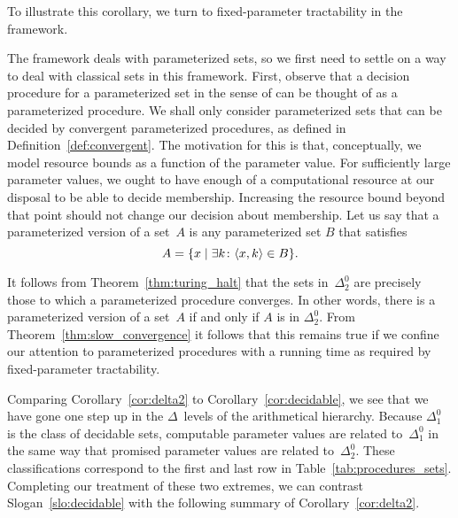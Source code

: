 To illustrate this corollary, we turn to fixed-parameter tractability in the \citeauthor{downey1999parameterized} framework.
\begin{example}
\label{ex:delta2}%
  The \citeauthor{downey1999parameterized} framework deals with parameterized sets, so we first need to settle on a way to deal with classical sets in this framework.
  First, observe that a decision procedure for a parameterized set in the sense of \citeauthor{downey1999parameterized} can be thought of as a parameterized procedure.
  We shall only consider parameterized sets that can be decided by convergent parameterized procedures, as defined in Definition~\ref{def:convergent}.
  The motivation for this is that, conceptually, we model resource bounds as a function of the parameter value.
  For sufficiently large parameter values, we ought to have enough of a computational resource at our disposal to be able to decide membership.
  Increasing the resource bound beyond that point should not change our decision about membership.
  Let us say that a parameterized version of a set~$A$ is any parameterized set $B$ that satisfies
  \begin{equation*}
    A = \{x \;|\; \exists k\colon {\langle x, k\rangle} \in B\}.
  \end{equation*}

  It follows from Theorem~\ref{thm:turing_halt} that the sets in~$\Delta^0_2$ are precisely those to which a parameterized procedure converges.
  In other words, there is a parameterized version of a set~$A$ if and only if $A$ is in $\Delta^0_2$.
  From Theorem~\ref{thm:slow_convergence} it follows that this remains true if we confine our attention to parameterized procedures with a running time as required by fixed-parameter tractability.
\end{example}

Comparing Corollary~\ref{cor:delta2} to Corollary~\ref{cor:decidable}, we see that we have gone one step up in the $\Delta$~levels of the arithmetical hierarchy.
Because $\Delta^0_1$ is the class of decidable sets, computable parameter values are related to~$\Delta^0_1$ in the same way that promised parameter values are related to~$\Delta^0_2$.
These classifications correspond to the first and last row in Table~\ref{tab:procedures_sets}.
Completing our treatment of these two extremes, we can contrast Slogan~\ref{slo:decidable} with the following summary of Corollary~\ref{cor:delta2}.

